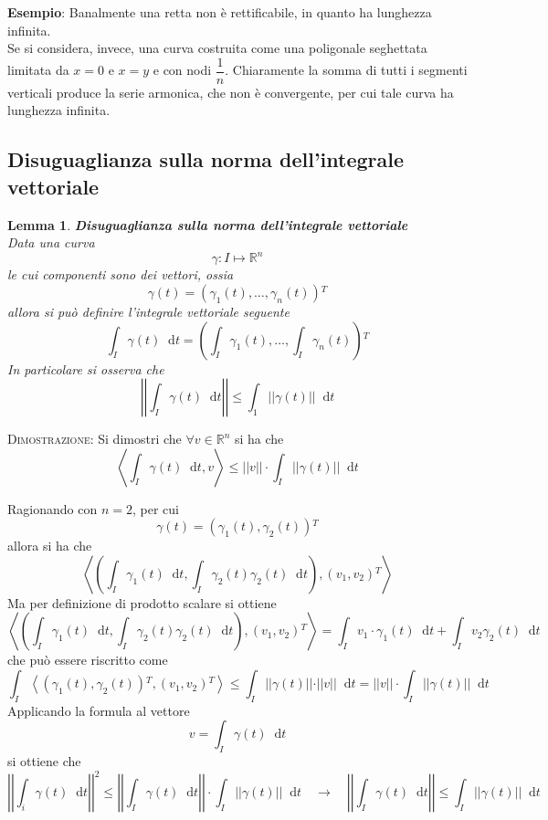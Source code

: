 \documentclass[a4paper]{extarticle}
\newtheorem{lemma}[theorem]{Lemma}
\newcommand*\dif{\mathop{}\!\mathrm{d}}
\begin{document}
\vspace{2em}
\noindent
\textbf{Esempio}: Banalmente una retta non è rettificabile, in quanto ha lunghezza infinita.\\
Se si considera, invece, una curva costruita come una poligonale seghettata limitata da $x=0$ e $x=y$ e con nodi $\dfrac{1}{n}$. Chiaramente la somma di tutti i segmenti verticali produce la serie armonica, che non è convergente, per cui tale curva ha lunghezza infinita.

\vspace{1em}
\subsection{Disuguaglianza sulla norma dell'integrale vettoriale}
\begin{lemma}\textbf{Disuguaglianza sulla norma dell'integrale vettoriale}\\
    Data una curva
    \[\gamma : I \longmapsto \mathbb{R}^n\]
    le cui componenti sono dei vettori, ossia
    \[\gamma(t) = \left(\gamma_1(t),\dots,\gamma_n(t)\right){^T}\]
    allora si può definire l'integrale vettoriale seguente
    \[\int_I \gamma(t) \dif t = \left(\int_I \gamma_1(t), \dots, \int_I \gamma_n(t)\right){^T}\]
    In particolare si osserva che
    \[\left\vert\left\vert\int_I \gamma(t)\dif t\right\vert\right\vert\leq\int_1\left\vert\left\vert\gamma(t)\right\vert\right\vert\dif t\]
\end{lemma}

\vspace{2em}
\noindent
\normalfont \normalsize
\textsc{Dimostrazione}: Si dimostri che $\forall v \in \mathbb{R}^n$ si ha che
\[\left<\int_I \gamma(t) \dif t, v\right> \leq \left \vert \left \vert v \right \vert \right \vert \cdot \int_I \left \vert \left \vert \gamma(t) \right \vert \right \vert \dif t\]

\vspace{1em}
\noindent
Ragionando con $n=2$, per cui
\[\gamma(t)=(\gamma_1(t),\gamma_2(t)){^T}\]
allora si ha che
\[\left<\left(\int_I \gamma_1(t) \dif t, \int_I \gamma_2(t) \gamma_2(t) \dif t\right), (v_1,v_2){^T}\right>\]
Ma per definizione di prodotto scalare si ottiene
\[\left<\left(\int_I \gamma_1(t) \dif t, \int_I \gamma_2(t) \gamma_2(t) \dif t\right), (v_1,v_2){^T}\right> = \int_I v_1 \cdot \gamma_1(t) \dif t + \int_I v_2 \gamma_2(t) \dif t\]
che può essere riscritto come
\[\int_I \left<(\gamma_1(t), \gamma_2(t)){^T},(v_1,v_2){^T}\right> \leq \int_I \vert \vert \gamma(t) \vert \vert \cdot \vert \vert v \vert \vert \dif t = \vert \vert v \vert \vert \cdot \int_I \vert \vert \gamma(t) \vert \vert \dif t\]
Applicando la formula al vettore
\[v = \int_I \gamma(t) \dif t\]
si ottiene che
\[\left \vert \left \vert \int_i \gamma(t) \dif t \right \vert \right \vert^2 \leq \left \vert \left \vert \int_I \gamma(t) \dif t \right \vert \right \vert \cdot \int_I \left \vert \left \vert \gamma(t) \right \vert \right \vert \dif t \hspace{1em} \rightarrow \hspace{1em} \left \vert \left \vert \int_I \gamma(t) \dif t \right \vert \right \vert \leq \int_I \left \vert \left \vert \gamma(t) \right \vert \right \vert \dif t\]
\end{document}
